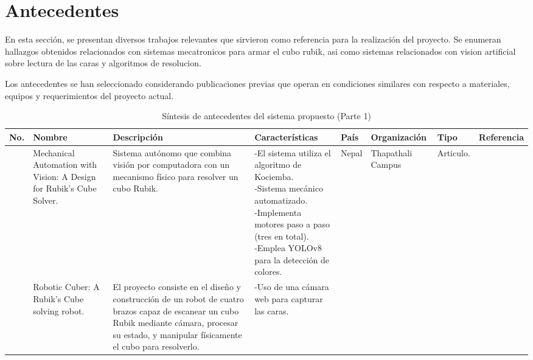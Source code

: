 \newpage
\section{Antecedentes}

\label{Antecedentes}
En esta sección, se presentan diversos trabajos relevantes que sirvieron como referencia para la realización del proyecto. Se enumeran hallazgos obtenidos relacionados con sistemas mecatronicos para armar el cubo rubik, asi como sistemas relacionados con vision artificial sobre lectura de las caras y algoritmos de resolucion.

Los antecedentes se han seleccionado considerando publicaciones previas que operan en condiciones similares con respecto a materiales, equipos y requerimientos del proyecto actual. 


\begin{sidewaystable}
  \scriptsize
  \centering
  \caption{ Síntesis de antecedentes del sistema propuesto (Parte 1)}
  \begin{tabular}{m{5mm} m{25mm} m{45mm} m{40mm} m{15mm} m{18mm} m{12mm} m{14mm}}
    \toprule
    \centering \textbf{No.} & \centering \textbf{Nombre} & \centering \textbf{Descripción} & \centering \textbf{Características} & \centering \textbf{País} & \centering \textbf{Organización} & \centering \textbf{Tipo} & \textbf{Referencia} \\ 
    \midrule
    \centering 1 & \centering Mechanical Automation with Vision: A Design for Rubik’s Cube Solver. & 
    \parbox{45mm}{Sistema autónomo que combina visión por computadora con un mecanismo físico para resolver un cubo Rubik.} & 
    \parbox{40mm}{
        -El sistema utiliza el algoritmo de Kociemba.\\
        -Sistema mecánico automatizado.\\
        -Implementa motores paso a paso (tres en total).\\
        -Emplea YOLOv8 para la detección de colores.\\} & 
    \centering Nepal & \centering Thapathali Campus & \centering Articulo. &  \\ 
    \midrule
     & \centering Robotic Cuber: A Rubik’s Cube solving robot. & \parbox{45mm}{El proyecto consiste en el diseño y construcción de un robot de cuatro brazos capaz de escanear un cubo Rubik mediante cámara, procesar su estado, y manipular físicamente el cubo para resolverlo.} & 
    \parbox{40mm}{
    -Uso de una cámara web para capturar las caras.\\
}
\end{tabular}
\end{sidewaystable}
